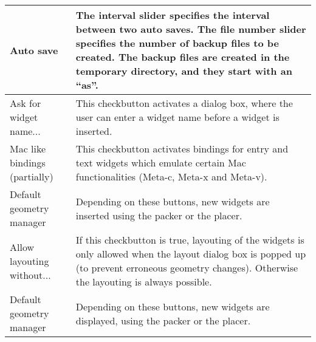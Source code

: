 {\newpage
\clearpage
\samepage \begin{figure}[hbt]
  \centerline{
  \epsfysize=13.5cm
  }
  
  \label{fig:The procedure XFProcOptionsGeneral}
\end{figure}
}

{\newpage
\clearpage
\samepage \begin{supertabular}{|l|p{6.5cm}|}
Auto save                    & The interval slider specifies
                               the interval between two auto
                               saves. The file number slider
                               specifies the number of
                               backup files to be created.
                               The backup files are created
                               in the temporary directory,
                               and they start with an ``as''.\\  \hline 
Ask for widget name...       & This checkbutton activates a
                               dialog box, where the user
                               can enter a widget name
                               before a widget is inserted.\\  \hline
Mac like bindings (partially)& This checkbutton activates
                               bindings for entry and text
                               widgets which emulate certain
                               Mac functionalities (Meta-c,
                               Meta-x and Meta-v).\\  \hline
Default geometry manager     & Depending on these buttons,
                               new widgets are inserted
                               using the packer or the
                               placer.\\  \hline
Allow layouting without...   & If this checkbutton is true,
                               layouting of the widgets is
                               only allowed when the layout
                               dialog box is popped up (to
                               prevent erroneous geometry
                               changes). Otherwise the
                               layouting is always
                               possible.\\  \hline
Default geometry manager     & Depending on these buttons,
                               new widgets are displayed,
                               using the packer or the
                               placer.\\  \hline

\end{supertabular}}

